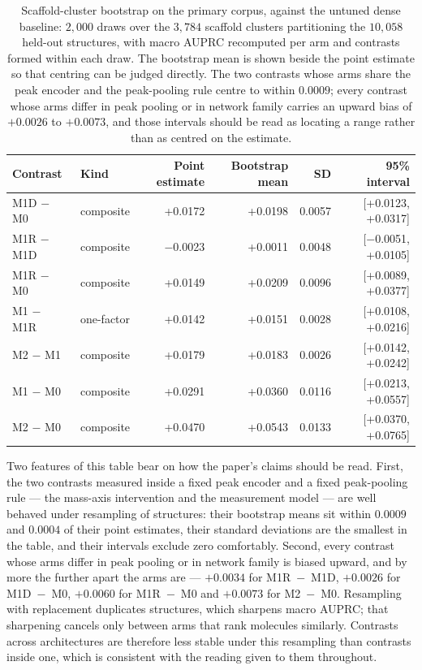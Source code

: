 \documentclass[11pt]{article}
\begin{document}
\begin{table}[ht]
\centering
\caption{Scaffold-cluster bootstrap on the primary corpus, against the untuned
dense baseline: $2{,}000$ draws over the
$3{,}784$ scaffold clusters partitioning the $10{,}058$ held-out structures, with
macro AUPRC recomputed per arm and contrasts formed within each draw. The bootstrap
mean is shown beside the point estimate so that centring can be judged directly.
The two contrasts whose arms share the peak encoder and the
peak-pooling rule centre to within $0.0009$; every contrast whose arms differ in
peak pooling or in network family carries an upward bias of $+0.0026$ to
$+0.0073$, and those intervals should be read as locating a range rather than as
centred on the estimate.}
\label{tab:scaffold}
\small
\begin{tabular}{llrrrr}
\toprule
Contrast & Kind & Point estimate & Bootstrap mean & SD & 95\% interval\\
\midrule
M1D $-$ M0 & composite & +0.0172 & +0.0198 & 0.0057 & [+0.0123, +0.0317]\\
M1R $-$ M1D & composite & $-$0.0023 & +0.0011 & 0.0048 & [$-$0.0051, +0.0105]\\
M1R $-$ M0 & composite & +0.0149 & +0.0209 & 0.0096 & [+0.0089, +0.0377]\\
M1 $-$ M1R & one-factor & +0.0142 & +0.0151 & 0.0028 & [+0.0108, +0.0216]\\
M2 $-$ M1 & composite & +0.0179 & +0.0183 & 0.0026 & [+0.0142, +0.0242]\\
M1 $-$ M0 & composite & +0.0291 & +0.0360 & 0.0116 & [+0.0213, +0.0557]\\
M2 $-$ M0 & composite & +0.0470 & +0.0543 & 0.0133 & [+0.0370, +0.0765]\\
\bottomrule
\end{tabular}
\end{table}

Two features of this table bear on how the paper's claims should be read. First,
the two contrasts measured inside a fixed peak encoder and a fixed peak-pooling
rule --- the mass-axis intervention and the measurement model --- are well behaved
under resampling of structures: their bootstrap means sit within $0.0009$ and
$0.0004$ of their point estimates, their standard deviations are the smallest in
the table, and their intervals exclude zero comfortably. Second, every contrast
whose arms differ in peak pooling or in network family is biased upward, and by
more the further apart the arms are --- $+0.0034$ for M1R~$-$~M1D, $+0.0026$ for
M1D~$-$~M0, $+0.0060$ for M1R~$-$~M0 and $+0.0073$ for M2~$-$~M0. Resampling with
replacement duplicates structures, which sharpens macro AUPRC; that sharpening
cancels only between arms that rank molecules similarly. Contrasts across
architectures are therefore less stable under this resampling than contrasts
inside one, which is consistent with the reading given to them throughout.
\end{document}
